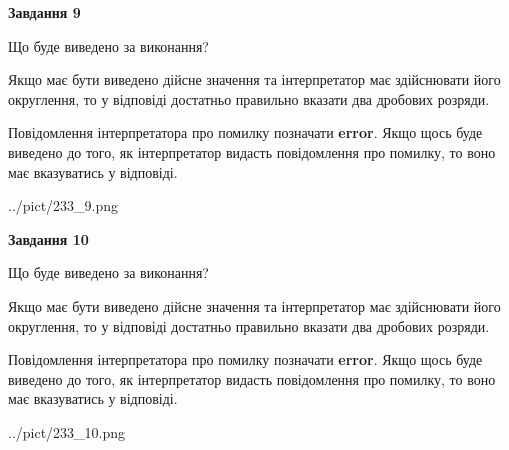 \documentclass[12pt, ukrainian]{article}
\begin{document}
{\begin {Large}
{\begin {center}\textbf{Завдання 9}\end {center}}\par
Що буде виведено за виконання? \par

Якщо має бути виведено дійсне значення та інтерпретатор має здійснювати його округлення, 
то у відповіді достатньо правильно вказати два дробових розряди.

Повідомлення інтерпретатора про помилку позначати \textbf{error}.
Якщо щось буде виведено до того, як інтерпретатор видасть повідомлення про помилку, 
то воно має вказуватись у відповіді. \par

\begin{center}
	{../pict/233_9.png}
\end{center}
\newpage

{\begin {center}\textbf{Завдання 10}\end {center}}\par
Що буде виведено за виконання? \par

Якщо має бути виведено дійсне значення та інтерпретатор має здійснювати його округлення, 
то у відповіді достатньо правильно вказати два дробових розряди.

Повідомлення інтерпретатора про помилку позначати \textbf{error}.
Якщо щось буде виведено до того, як інтерпретатор видасть повідомлення про помилку, 
то воно має вказуватись у відповіді. \par

\begin{center}
	{../pict/233_10.png}
\end{center}
\newpage

\end {Large}}
\end{document}
